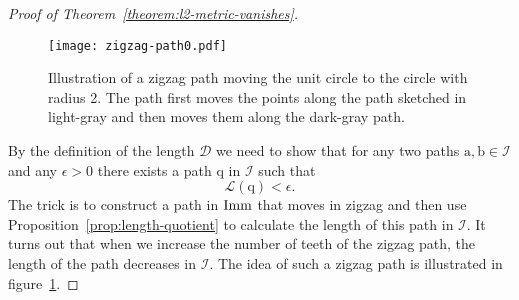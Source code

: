 \message{ !name(mainfile.tex)}\documentclass[a4,danish]{article}
\begin{document}
\begin{proof}[Proof of Theorem~\ref{theorem:l2-metric-vanishes}]

  \begin{figure}
    \centerline{\texttt{[image: zigzag-path0.pdf]}}
    \caption[]{Illustration of a zigzag path moving the unit circle to the circle with radius 2. The path first moves the points along the path sketched in light-gray and then moves them along the dark-gray path.}
    \label{fig:zigzag-path}
  \end{figure}

  By the definition of the length $\mathcal{D}$ we need to show that for any two paths $\mathrm{a},\mathrm{b} \in \mathcal{I}$ and any $\epsilon >0 $ there exists a path $\mathrm{q}$ in $\mathcal{I}$ such that
  \begin{equation*}
    \mathcal{L}(\mathrm{q}) < \epsilon.
  \end{equation*}
  The trick is to construct a path in $\mathop{}\!\mathrm{Imm}$ that moves in zigzag and then use Proposition~\ref{prop:length-quotient} to calculate the length of this path in $\mathcal{I}$.
  It turns out that when we increase the number of teeth of the zigzag path, the length of the path decreases in $\mathcal{I}$.
  The idea of such a zigzag path is illustrated in figure~\ref{fig:zigzag-path}.


\end{proof}
\end{document}
